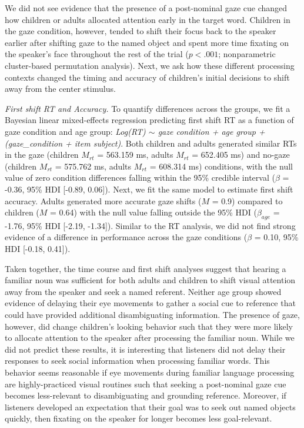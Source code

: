 \documentclass[10pt, letterpaper]{article}
\begin{document}
We did not see evidence that the presence of a post-nominal gaze cue
changed how children or adults allocated attention early in the target
word. Children in the gaze condition, however, tended to shift their
focus back to the speaker earlier after shifting gaze to the named
object and spent more time fixating on the speaker's face throughout the
rest of the trial (\(p < .001\); nonparametric cluster-based permutation
analysis). Next, we ask how these different processing contexts changed
the timing and accuracy of children's initial decisions to shift away
from the center stimulus.

\emph{First shift RT and Accuracy.} To quantify differences across the
groups, we fit a Bayesian linear mixed-effects regression predicting
first shift RT as a function of gaze condition and age group:
\emph{Log(RT) \(\sim\) gaze condition + age group + (gaze\_condition +
item \textbar{} subject)}. Both children and adults generated similar
RTs in the gaze (children \(M_{rt}\) = 563.159 ms, adults \(M_{rt}\) =
652.405 ms) and no-gaze (children \(M_{rt}\) = 575.762 ms, adults
\(M_{rt}\) = 608.314 ms) conditions, with the null value of zero
condition differences falling within the 95\% credible interval
(\(\beta\) = -0.36, 95\% HDI {[}-0.89, 0.06{]}). Next, we fit the same
model to estimate first shift accuracy. Adults generated more accurate
gaze shifts (\(M\) = 0.9) compared to children (\(M\) = 0.64) with the
null value falling outside the 95\% HDI (\(\beta_{age}\) = -1.76, 95\%
HDI {[}-2.19, -1.34{]}). Similar to the RT analysis, we did not find
strong evidence of a difference in performance across the gaze
conditions (\(\beta\) = 0.10, 95\% HDI {[}-0.18, 0.41{]}).

Taken together, the time course and first shift analyses suggest that
hearing a familiar noun was sufficient for both adults and children to
shift visual attention away from the speaker and seek a named referent.
Neither age group showed evidence of delaying their eye movements to
gather a social cue to reference that could have provided additional
disambiguating information. The presence of gaze, however, did change
children's looking behavior such that they were more likely to allocate
attention to the speaker after processing the familiar noun. While we
did not predict these results, it is interesting that listeners did not
delay their responses to seek social information when processing
familiar words. This behavior seems reasonable if eye movements during
familiar language processing are highly-practiced visual routines such
that seeking a post-nominal gaze cue becomes less-relevant to
disambiguating and grounding reference. Moreover, if listeners developed
an expectation that their goal was to seek out named objects quickly,
then fixating on the speaker for longer becomes less goal-relevant.
\end{document}
